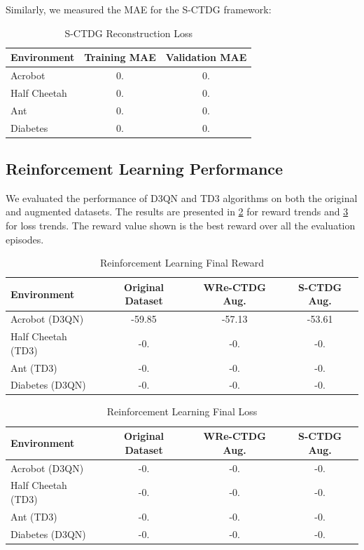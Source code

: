 Similarly, we measured the MAE for the S-CTDG framework:

\begin{table}[h]
\centering
\begin{tabular}{|l|c|c|}
\hline
Environment & Training MAE & Validation MAE \\
\hline
Acrobot & 0. & 0. \\
Half Cheetah & 0. & 0. \\
Ant & 0. & 0. \\
Diabetes & 0. & 0. \\
\hline
\end{tabular}
\caption{S-CTDG Reconstruction Loss}
\label{tab:s}
\end{table}



\subsection{Reinforcement Learning Performance}

We evaluated the performance of D3QN and TD3 algorithms on both the
original and augmented datasets. The results are presented
in \ref{tab:rl_reward} for reward trends and \ref{tab:rl_loss}
for loss trends. The reward value shown is the best reward
over all the evaluation episodes.

\begin{table}[h]
    \centering
    \begin{tabular}{|l|c|c|c|}
    \hline
    Environment & Original Dataset & WRe-CTDG Aug. & S-CTDG Aug. \\
    \hline
    Acrobot (D3QN) & -59.85 & -57.13 & -53.61 \\
    Half Cheetah (TD3) & -0. & -0. & -0. \\
    Ant (TD3) & -0. & -0. & -0. \\
    Diabetes (D3QN) & -0. & -0. & -0. \\
    \hline
    \end{tabular}
    \caption{Reinforcement Learning Final Reward}
    \label{tab:rl_reward}
\end{table}

\begin{table}[h]
    \centering
    \begin{tabular}{|l|c|c|c|}
    \hline
    Environment & Original Dataset & WRe-CTDG Aug. & S-CTDG Aug. \\
    \hline
    Acrobot (D3QN) & -0. & -0. & -0. \\
    Half Cheetah (TD3) & -0. & -0. & -0. \\
    Ant (TD3) & -0. & -0. & -0. \\
    Diabetes (D3QN) & -0. & -0. & -0. \\
    \hline
    \end{tabular}
    \caption{Reinforcement Learning Final Loss}
    \label{tab:rl_loss}
\end{table}


